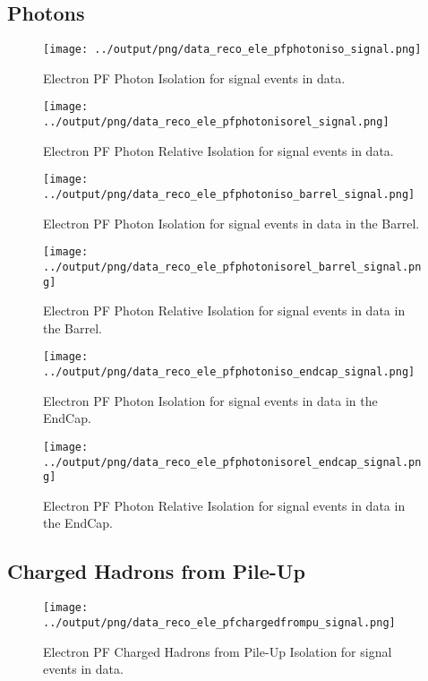 \documentclass[11pt]{book}
\begin{document}
\subsection{Photons}
\begin{figure}[htb]
\centering
\texttt{[image: ../output/png/data\_reco\_ele\_pfphotoniso\_signal.png]}
\caption{Electron PF Photon Isolation for signal events in data.}
\label{fig:data_ele_pfphotoniso_signal}
\end{figure}

\begin{figure}[htb]
\centering
\texttt{[image: ../output/png/data\_reco\_ele\_pfphotonisorel\_signal.png]}
\caption{Electron PF Photon Relative Isolation for signal events in data.}
\label{fig:data_ele_pfphotonisorel_signal}
\end{figure}

\begin{figure}[htb]
\centering
\texttt{[image: ../output/png/data\_reco\_ele\_pfphotoniso\_barrel\_signal.png]}
\caption{Electron PF Photon Isolation for signal events in data in the Barrel.}
\label{fig:data_ele_pfphotoniso_barrel_signal}
\end{figure}

\begin{figure}[htb]
\centering
\texttt{[image: ../output/png/data\_reco\_ele\_pfphotonisorel\_barrel\_signal.png]}
\caption{Electron PF Photon Relative Isolation for signal events in data in the Barrel.}
\label{fig:data_ele_pfphotonisorel_barrel_signal}
\end{figure}


\begin{figure}[htb]
\centering
\texttt{[image: ../output/png/data\_reco\_ele\_pfphotoniso\_endcap\_signal.png]}
\caption{Electron PF Photon Isolation for signal events in data in the EndCap.}
\label{fig:data_ele_pfphotoniso_endcap_signal}
\end{figure}

\begin{figure}[htb]
\centering
\texttt{[image: ../output/png/data\_reco\_ele\_pfphotonisorel\_endcap\_signal.png]}
\caption{Electron PF Photon Relative Isolation for signal events in data in the EndCap.}
\label{fig:data_ele_pfphotonisorel_endcap_signal}
\end{figure}
\clearpage

\subsection{Charged Hadrons from Pile-Up}
\begin{figure}[htb]
\centering
\texttt{[image: ../output/png/data\_reco\_ele\_pfchargedfrompu\_signal.png]}
\caption{Electron PF Charged Hadrons from Pile-Up Isolation for signal events in data.}
\label{fig:data_ele_pfchargedfrompu_signal}
\end{figure}
\end{document}
